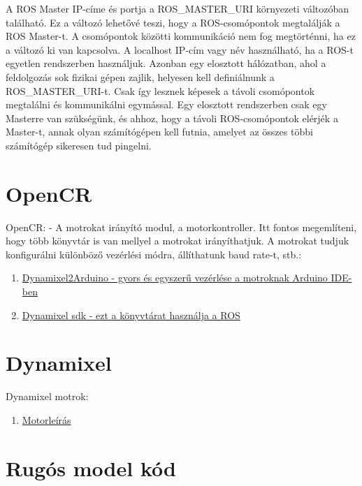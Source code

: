\documentclass{article}
\begin{document}
A ROS Master IP-címe és portja a ROS\_MASTER\_URI környezeti változóban található. Ez a változó lehetővé teszi, hogy a ROS-csomópontok megtalálják a ROS Master-t. A csomópontok közötti kommunikáció nem fog megtörténni, ha ez a változó ki van kapcsolva. A localhost IP-cím vagy név használható, ha a ROS-t egyetlen rendszerben használjuk. Azonban egy elosztott hálózatban, ahol a feldolgozás sok fizikai gépen zajlik, helyesen kell definiálnunk a ROS\_MASTER\_URI-t. Csak így lesznek képesek a távoli csomópontok megtalálni és kommunikálni egymással. Egy elosztott rendszerben csak egy Masterre van szükségünk, és ahhoz, hogy a távoli ROS-csomópontok elérjék a Master-t, annak olyan számítógépen kell futnia, amelyet az összes többi számítógép sikeresen tud pingelni.
\cite{joseph:ros}

\section{OpenCR}
OpenCR: - A motrokat irányító modul, a motorkontroller. Itt fontos megemlíteni, hogy több könyvtár is van mellyel a motrokat irányíthatjuk. A motrokat tudjuk konfigurálni különböző vezérlési módra, állíthatunk baud rate-t, stb.:
\begin{enumerate}
    \item \href{https://www.youtube.com/watch?v=0_M0Da9SHDw}{Dynamixel2Arduino - gyors és egyszerű vezérlése a motroknak Arduino IDE-ben}
    \item \href{https://emanual.robotis.com/docs/en/software/dynamixel/dynamixel_sdk/overview/}{Dynamixel sdk - ezt a könyvtárat használja a ROS}
\end{enumerate}

\section{Dynamixel}
Dynamixel motrok:
\begin{enumerate}
    \item \href{https://emanual.robotis.com/docs/en/dxl/x/xl430-w250/}{Motorleírás}
\end{enumerate}

\section{Rugós model kód}

\printbibliography[title={Referenciák}]
\end{document}
